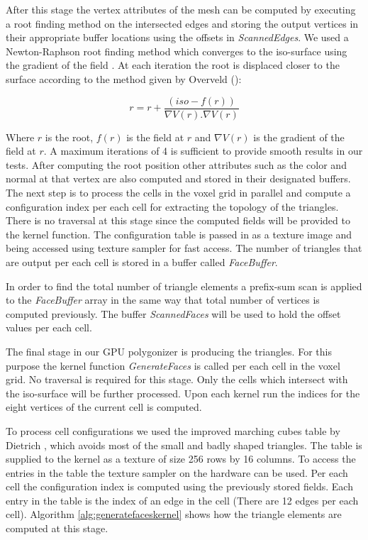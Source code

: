 After this stage the vertex attributes of the mesh can be computed by executing a root finding method on the intersected 
edges and storing the output vertices in their appropriate buffer locations using the offsets in \textit{ScannedEdges}.
We used a Newton-Raphson root finding method which converges to the iso-surface using the gradient of the field \cite{Matthews1987}.
At each iteration the root is displaced closer to the surface according to the method given by Overveld \etal (\cite{VanOverveld2004}):

\begin{equation}
 r = r + \frac{\left(iso - f(r)\right)}{\nabla V(r).\nabla V(r)}
\end{equation}

Where $r$ is the root, $f(r)$ is the field at $r$ and $\nabla V(r)$ is the gradient of the field at $r$.
A maximum iterations of 4 is sufficient to provide smooth results in our tests. 
After computing the root position other attributes such as the color and normal at that vertex are also computed and stored in their 
designated buffers. The next step is to process the cells in the voxel grid in parallel and compute a configuration index per each cell
for extracting the topology of the triangles. There is no \blob traversal at this stage since the computed fields will be provided
to the kernel function. The configuration table is passed in as a texture image and being accessed using texture sampler for 
fast access. The number of triangles that are output per each cell is stored in a buffer called \textit{FaceBuffer}.

In order to find the total number of triangle elements a prefix-sum scan is applied to the \textit{FaceBuffer} array 
in the same way that total number of vertices is computed previously. The buffer \textit{ScannedFaces} will be used to hold the 
offset values per each cell. 

The final stage in our GPU polygonizer is producing the triangles. For this purpose the kernel function \textit{GenerateFaces} 
is called per each cell in the voxel grid. No \blob traversal is required for this stage. Only the cells which intersect with the 
iso-surface will be further processed. Upon each kernel run the indices for the eight vertices of the current cell is computed. 

To process cell configurations we used the improved marching cubes table by Dietrich \etal 
\cite{Dietrich2009}, which avoids most of the small and badly shaped triangles. The table is supplied to the kernel as 
a texture of size 256 rows by 16 columns. To access the entries in the table the texture sampler on the hardware 
can be used. Per each cell the configuration index is computed using the previously stored fields. Each entry in the table is the 
index of an edge in the cell (There are 12 edges per each cell). Algorithm \ref{alg:generatefaceskernel} shows how the 
triangle elements are computed at this stage.

